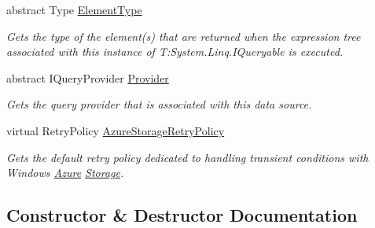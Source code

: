 \begin{DoxyCompactItemize}
abstract Type \hyperlink{classCqrs_1_1Azure_1_1BlobStorage_1_1StorageStore_af298920154f31a7d0117facbb2f7cd54_af298920154f31a7d0117facbb2f7cd54}{Element\+Type}
\begin{DoxyCompactList}\small\item\em Gets the type of the element(s) that are returned when the expression tree associated with this instance of T\+:\+System.\+Linq.\+I\+Queryable is executed. \end{DoxyCompactList}\item 
abstract I\+Query\+Provider \hyperlink{classCqrs_1_1Azure_1_1BlobStorage_1_1StorageStore_a3cc5fd841fb449ca365d05a52e8e8438_a3cc5fd841fb449ca365d05a52e8e8438}{Provider}
\begin{DoxyCompactList}\small\item\em Gets the query provider that is associated with this data source. \end{DoxyCompactList}\item 
virtual Retry\+Policy \hyperlink{classCqrs_1_1Azure_1_1BlobStorage_1_1StorageStore_ad16f8d276c7570c95979b39098d1216b_ad16f8d276c7570c95979b39098d1216b}{Azure\+Storage\+Retry\+Policy}
\begin{DoxyCompactList}\small\item\em Gets the default retry policy dedicated to handling transient conditions with Windows \hyperlink{namespaceCqrs_1_1Azure}{Azure} \hyperlink{namespaceCqrs_1_1Azure_1_1Storage}{Storage}. \end{DoxyCompactList}\end{DoxyCompactItemize}


\subsection{Constructor \& Destructor Documentation}
\mbox{\label{classCqrs_1_1Azure_1_1BlobStorage_1_1StorageStore_ae7a725cdcb7de73e097b02c19463bae7_ae7a725cdcb7de73e097b02c19463bae7}} 
